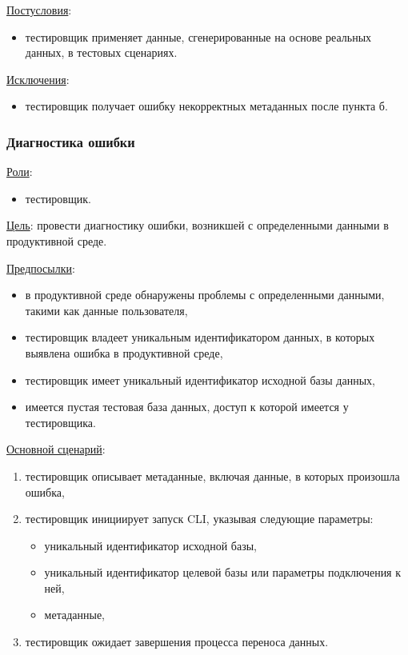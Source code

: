 \underline{Постусловия}:

\begin{itemize}
    \item тестировщик применяет данные, сгенерированные на основе реальных данных, в тестовых сценариях.
\end{itemize}

\underline{Исключения}:

\begin{itemize}
    \item тестировщик получает ошибку некорректных метаданных после пункта б.
\end{itemize}


\subsubsection{Диагностика ошибки}

\underline{Роли}:

\begin{itemize}
    \item тестировщик.
\end{itemize}

\underline{Цель}: провести диагностику ошибки, возникшей с определенными данными в продуктивной среде.

\underline{Предпосылки}:

\begin{itemize}
    \item в продуктивной среде обнаружены проблемы с определенными данными, такими как данные пользователя,
    \item тестировщик владеет уникальным идентификатором данных, в которых выявлена ошибка в продуктивной среде,
    \item тестировщик имеет уникальный идентификатор исходной базы данных,
    \item имеется пустая тестовая база данных, доступ к которой имеется у тестировщика.
\end{itemize}

\underline{Основной сценарий}:

\begin{enumerate}
    \item тестировщик описывает метаданные, включая данные, в которых произошла ошибка,
    \item тестировщик инициирует запуск CLI, указывая следующие параметры:
    \begin{itemize}
        \item уникальный идентификатор исходной базы,
        \item уникальный идентификатор целевой базы или параметры подключения к ней,
        \item метаданные,
    \end{itemize}
    \item тестировщик ожидает завершения процесса переноса данных.
\end{enumerate}


